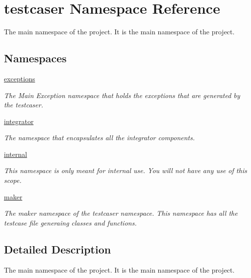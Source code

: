 \hypertarget{namespacetestcaser}{}\section{testcaser Namespace Reference}
\label{namespacetestcaser}


The main namespace of the project. It is the main namespace of the project.  


\subsection*{Namespaces}
\begin{DoxyCompactItemize}
\item 
 \mbox{\hyperlink{namespacetestcaser_1_1exceptions}{exceptions}}
\begin{DoxyCompactList}\small\item\em The Main Exception namespace that holds the exceptions that are generated by the testcaser. \end{DoxyCompactList}\item 
 \mbox{\hyperlink{namespacetestcaser_1_1integrator}{integrator}}
\begin{DoxyCompactList}\small\item\em The namespace that encapsulates all the integrator components. \end{DoxyCompactList}\item 
 \mbox{\hyperlink{namespacetestcaser_1_1internal}{internal}}
\begin{DoxyCompactList}\small\item\em This namespace is only meant for internal use. You will not have any use of this scope. \end{DoxyCompactList}\item 
 \mbox{\hyperlink{namespacetestcaser_1_1maker}{maker}}
\begin{DoxyCompactList}\small\item\em The maker namespace of the testcaser namespace. This namespace has all the testcase file generaing classes and functions. \end{DoxyCompactList}\end{DoxyCompactItemize}


\subsection{Detailed Description}
The main namespace of the project. It is the main namespace of the project. 

